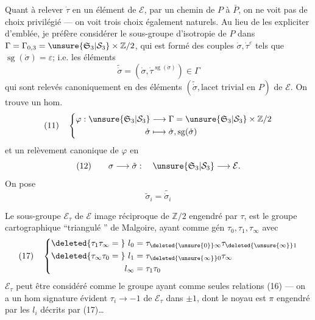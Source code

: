 Quant à relever $\dot\tau$ en un élément de $\mathcal E$, par un chemin de $P$ à $\bar P$, on ne voit pas de choix privilégié --- on voit trois choix également naturels. Au lieu de les expliciter d'emblée, je préfère considérer le sous-groupe d'isotropie de $P$ dans $\Gamma=\Gamma_{0,3}=\unsure{\mathfrak S_3|\mathcal S_3}\times\mathbb Z/2$, qui est formé des couples $\dot\sigma,\dot\tau^\varepsilon$ tels que $\operatorname{sg}(\dot\sigma)=\varepsilon$;  i.e. les éléments
\[
\widetilde{\dot\sigma}=(\dot\sigma,\dot\tau^{\operatorname{sg}(\dot\sigma)})\in\Gamma
\]
qui sont relevés canoniquement en des éléments $(\widetilde{\dot\sigma},\text{lacet trivial en }P)$ de $\mathcal E$. On trouve un hom.
\[
(11)\quad\left\{\begin{aligned}
\varphi:\unsure{\mathfrak S_3|\mathcal S_3}&\longrightarrow\Gamma=\unsure{\mathfrak S_3|\mathcal S_3}\times\mathbb Z/2\\
\dot\sigma&\longmapsto\dot\sigma,\operatorname{sg}(\dot\sigma)
\end{aligned}\right.
\]
et un relèvement canonique de $\varphi$ en
\[
(12)\qquad\sigma\longrightarrow\tilde\sigma:\quad\unsure{\mathfrak S_3|\mathcal S_3}\longrightarrow\mathcal E.
\]
On pose
\[
\tilde\sigma_i=\widetilde{\dot\sigma_i}
\]

Le sous-groupe $\mathcal E_\tau$ de $\mathcal E$ image réciproque de $\mathbb Z/2$ engendré par $\tau$, est le groupe cartographique ``triangulé '' de Malgoire, ayant comme gén $\tau_0,\tau_1,\tau_\infty$  avec
\[
(17)\quad\left\{\begin{aligned}
\deleted{\tau_1\tau_\infty={}}\ l_0&=\tau_{\deleted{\unsure{0}}\infty}\tau_{\deleted{\unsure{\infty}}1}\\
\deleted{\tau_\infty\tau_0={}}\ l_1&=\tau_{\deleted{\unsure{\infty}}0}\tau_\infty\\
l_\infty&=\tau_1\tau_0
\end{aligned}\right.
\]
$\mathcal E_\tau$ peut être considéré comme le groupe ayant comme  seules relations (16) --- on a un hom signature évident $\tau_i\longrightarrow-1$ de $\mathcal E_\tau$ dans $\pm1$, dont le noyau est $\pi$ engendré par les $l_i$ décrits par (17)\ldots


